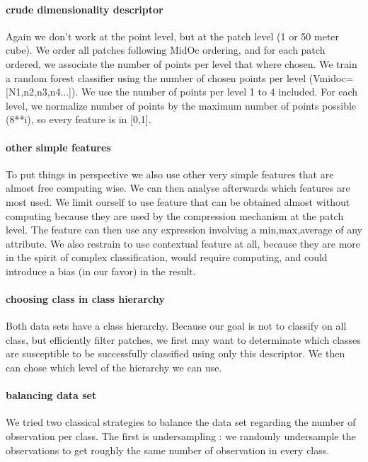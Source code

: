 			\paragraph{crude dimensionality descriptor}
				Again we don't work at the point level, but at the patch level (1 or 50 meter cube).
				We order all patches following MidOc ordering, and for each patch ordered, we associate the number of points per level that where chosen.
				We train a random forest classifier using the number of chosen points per level (Vmidoc=[N1,n2,n3,n4...]).
				We use the number of points per level 1 to 4 included. For each level, we normalize number of points by the maximum number of points possible (8**i), so every feature is in [0,1].
			
			\paragraph{other simple features}
				To put things in perspective we also use other very simple features that are almost free computing wise. We can then analyse afterwards which features are most used.
				We limit ourself to use feature that can be obtained almost without computing because they are used by the compression mechanism at the patch level. The feature can then use any expression involving a min,max,average of any attribute.
				We also restrain to use contextual feature at all, because they are more in the spirit of complex classification, would require computing, and could introduce a bias (in our favor) in the result.
			
			\paragraph{choosing class in class hierarchy}
				Both data sets have a class hierarchy. Because our goal is not to classify on all class, but efficiently filter patches, we first may want to determinate which classes are susceptible to be successfully classified using only this descriptor. 
				We then can chose which level of the hierarchy we can use.
				
			\paragraph{balancing data set}
				We tried two classical strategies to balance the data set regarding the number of observation per class.
				The first is undersampling : we randomly undersample the observations to get roughly the same number of observation in every class.
				
